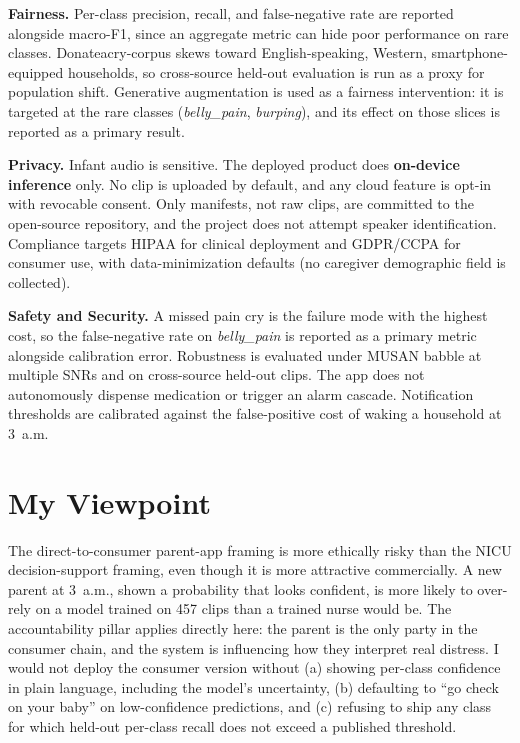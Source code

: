 \documentclass[11pt]{article}
\begin{document}
\textbf{Fairness.} Per-class precision, recall, and false-negative rate are reported alongside macro-F1, since an aggregate metric can hide poor performance on rare classes. Donateacry-corpus skews toward English-speaking, Western, smartphone-equipped households, so cross-source held-out evaluation is run as a proxy for population shift. Generative augmentation is used as a fairness intervention: it is targeted at the rare classes (\textit{belly\_pain}, \textit{burping}), and its effect on those slices is reported as a primary result.

\textbf{Privacy.} Infant audio is sensitive. The deployed product does \textbf{on-device inference} only. No clip is uploaded by default, and any cloud feature is opt-in with revocable consent. Only manifests, not raw clips, are committed to the open-source repository, and the project does not attempt speaker identification. Compliance targets HIPAA for clinical deployment and GDPR/CCPA for consumer use, with data-minimization defaults (no caregiver demographic field is collected).

\textbf{Safety and Security.} A missed pain cry is the failure mode with the highest cost, so the false-negative rate on \textit{belly\_pain} is reported as a primary metric alongside calibration error. Robustness is evaluated under MUSAN babble at multiple SNRs and on cross-source held-out clips. The app does not autonomously dispense medication or trigger an alarm cascade. Notification thresholds are calibrated against the false-positive cost of waking a household at 3~a.m.

\section*{My Viewpoint}
The direct-to-consumer parent-app framing is more ethically risky than the NICU decision-support framing, even though it is more attractive commercially. A new parent at 3~a.m., shown a probability that looks confident, is more likely to over-rely on a model trained on 457 clips than a trained nurse would be. The accountability pillar applies directly here: the parent is the only party in the consumer chain, and the system is influencing how they interpret real distress. I would not deploy the consumer version without (a) showing per-class confidence in plain language, including the model's uncertainty, (b) defaulting to ``go check on your baby'' on low-confidence predictions, and (c) refusing to ship any class for which held-out per-class recall does not exceed a published threshold.
\end{document}
